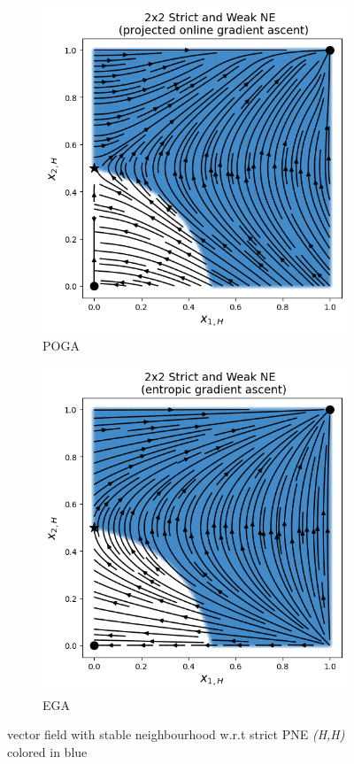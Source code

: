 \begin{figure}[H]
\captionsetup{justification=centering}
\centering
\begin{subfigure}{.5\textwidth}
    \centering
    \includegraphics[width=\textwidth]{logos/Weak1.png}
    \caption{POGA}
    \label{fig:Weak1a}
\end{subfigure}%
\begin{subfigure}{.5\textwidth}
    \centering
    \includegraphics[width=\textwidth]{logos/Weak2.png}
    \caption{EGA}
    \label{fig:Weak1b}
\end{subfigure}
\caption{vector field with stable neighbourhood w.r.t strict PNE \textit{(H,H)} colored in blue}
\label{fig:2x2Weak1}
\end{figure}

